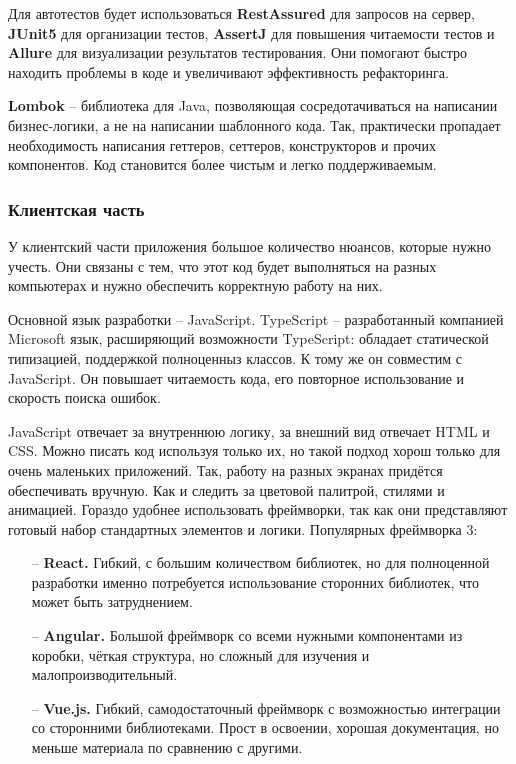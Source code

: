 \documentclass[a4paper,article]{article}
\begin{document}
    Для автотестов будет использоваться \textbf{RestAssured} для запросов на сервер, \textbf{JUnit5} для организации тестов, \textbf{AssertJ} для повышения читаемости тестов и \textbf{Allure} для визуализации результатов тестирования. Они помогают быстро находить проблемы в коде и увеличивают эффективность рефакторинга.

    \textbf{Lombok} -- библиотека для Java, позволяющая сосредотачиваться на написании бизнес-логики, а не на написании шаблонного кода. Так, практически пропадает необходимость написания геттеров, сеттеров, конструкторов и прочих компонентов. Код становится более чистым и легко поддерживаемым.

    \subsubsection{Клиентская часть}\label{Реализация. Выбор. Клиентская часть}

    У клиентский части приложения большое количество нюансов, которые нужно учесть. Они связаны с тем, что этот код будет выполняться на разных компьютерах и нужно обеспечить корректную работу на них.

    Основной язык разработки -- JavaScript. TypeScript -- разработанный компанией Microsoft язык, расширяющий возможности TypeScript: обладает статической типизацией, поддержкой полноценныз классов. К тому же он совместим с JavaScript. Он повышает читаемость кода, его повторное использование и скорость поиска ошибок.

    JavaScript отвечает за внутреннюю логику, за внешний вид отвечает HTML и CSS. Можно писать код используя только их, но такой подход хорош только для очень маленьких приложений. Так, работу на разных экранах придётся обеспечивать вручную. Как и следить за цветовой палитрой, стилями и анимацией. Гораздо удобнее использовать фреймворки, так как они представляют готовый набор стандартных элементов и логики. Популярных фреймворка 3:

        \begin{itemize}[nolistsep]
        \item[--] \textbf{React.} Гибкий, с большим количеством библиотек, но для полноценной разработки именно потребуется использование сторонних библиотек, что может быть затруднением.
        \item[--] \textbf{Angular.} Большой фреймворк со всеми нужными компонентами из коробки, чёткая структура, но сложный для изучения и малопроизводительный.
        \item[--] \textbf{Vue.js.} Гибкий, самодостаточный фреймворк с возможностью интеграции со сторонними библиотеками. Прост в освоении, хорошая документация, но меньше материала по сравнению с другими.
    \end{itemize}
\end{document}
